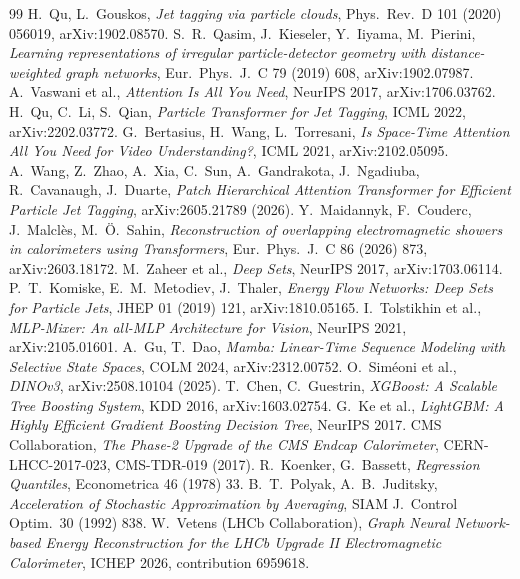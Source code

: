 \documentclass[11pt,a4paper]{article}
\begin{document}
\begin{thebibliography}{99}
 H.~Qu, L.~Gouskos,
\emph{Jet tagging via particle clouds},
Phys.\ Rev.\ D 101 (2020) 056019, arXiv:1902.08570.
 S.~R.~Qasim, J.~Kieseler, Y.~Iiyama, M.~Pierini,
\emph{Learning representations of irregular particle-detector geometry with
distance-weighted graph networks}, Eur.\ Phys.\ J.\ C 79 (2019) 608,
arXiv:1902.07987.
 A.~Vaswani et al.,
\emph{Attention Is All You Need}, NeurIPS 2017, arXiv:1706.03762.
 H.~Qu, C.~Li, S.~Qian,
\emph{Particle Transformer for Jet Tagging}, ICML 2022, arXiv:2202.03772.
 G.~Bertasius, H.~Wang, L.~Torresani,
\emph{Is Space-Time Attention All You Need for Video Understanding?},
ICML 2021, arXiv:2102.05095.
 A.~Wang, Z.~Zhao, A.~Xia, C.~Sun, A.~Gandrakota,
J.~Ngadiuba, R.~Cavanaugh, J.~Duarte,
\emph{Patch Hierarchical Attention Transformer for Efficient Particle Jet
Tagging}, arXiv:2605.21789 (2026).
 Y.~Maidannyk, F.~Couderc, J.~Malcl\`es, M.~\"O.~Sahin,
\emph{Reconstruction of overlapping electromagnetic showers in calorimeters
using Transformers}, Eur.\ Phys.\ J.\ C 86 (2026) 873, arXiv:2603.18172.
 M.~Zaheer et al.,
\emph{Deep Sets}, NeurIPS 2017, arXiv:1703.06114.
 P.~T.~Komiske, E.~M.~Metodiev, J.~Thaler,
\emph{Energy Flow Networks: Deep Sets for Particle Jets},
JHEP 01 (2019) 121, arXiv:1810.05165.
 I.~Tolstikhin et al.,
\emph{MLP-Mixer: An all-MLP Architecture for Vision}, NeurIPS 2021,
arXiv:2105.01601.
 A.~Gu, T.~Dao,
\emph{Mamba: Linear-Time Sequence Modeling with Selective State Spaces},
COLM 2024, arXiv:2312.00752.
 O.~Sim\'{e}oni et al.,
\emph{DINOv3}, arXiv:2508.10104 (2025).
 T.~Chen, C.~Guestrin,
\emph{XGBoost: A Scalable Tree Boosting System}, KDD 2016, arXiv:1603.02754.
 G.~Ke et al.,
\emph{LightGBM: A Highly Efficient Gradient Boosting Decision Tree},
NeurIPS 2017.
 CMS Collaboration,
\emph{The Phase-2 Upgrade of the CMS Endcap Calorimeter},
CERN-LHCC-2017-023, CMS-TDR-019 (2017).
 R.~Koenker, G.~Bassett,
\emph{Regression Quantiles}, Econometrica 46 (1978) 33.
 B.~T.~Polyak, A.~B.~Juditsky,
\emph{Acceleration of Stochastic Approximation by Averaging},
SIAM J.\ Control Optim.\ 30 (1992) 838.
 W.~Vetens (LHCb Collaboration),
\emph{Graph Neural Network-based Energy Reconstruction for the LHCb Upgrade II
Electromagnetic Calorimeter}, ICHEP 2026, contribution 6959618.

\end{thebibliography}
\end{document}
